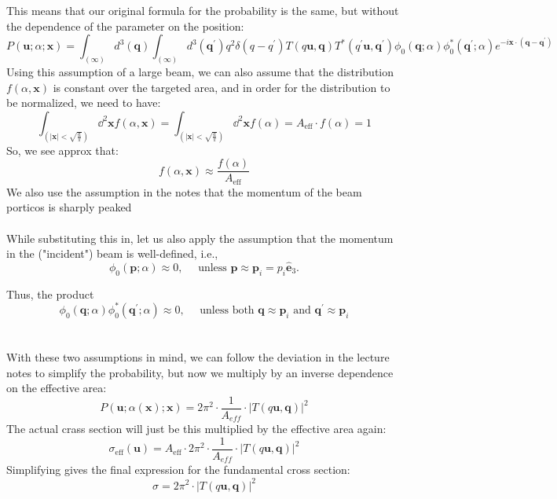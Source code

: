 \documentclass[12pt]{article}
\begin{document}
This means that our original formula for the probability is the same, but without the dependence of the parameter on the position:
\begin{equation}
P(\mathbf{u} ; \alpha ; \mathbf{x})= \int_{(\infty)} d^3(\mathbf{q}) \int_{(\infty)} d^3\left(\mathbf{q}^{\prime}\right) q^2 \delta\left(q-q^{\prime}\right) T(q \mathbf{u}, \mathbf{q}) T^*\left(q^{\prime} \mathbf{u}, \mathbf{q}^{\prime}\right) \phi_0(\mathbf{q} ; \alpha) \phi_0^*\left(\mathbf{q}^{\prime} ; \alpha\right) e^{-i \mathbf{x} \cdot\left(\mathbf{q}-\mathbf{q}^{\prime}\right)}
\end{equation}
Using this assumption of a large beam, we can also assume that the distribution $f(\alpha, \textbf{x})$ is constant over the targeted area, and in order for the distribution to be normalized, we need to have:
\begin{equation}
\int_{(|\textbf{x}| < \sqrt{\frac{a}{\pi}})} \dd^2{\textbf{x}} f(\alpha, \textbf{x}) = \int_{(|\textbf{x}| < \sqrt{\frac{a}{\pi}})} \dd^2{\textbf{x}} f(\alpha) = A_{\text{eff}} \cdot f(\alpha ) = 1
\end{equation}
So, we see approx that:
\begin{equation}
  f(\alpha ,\textbf{x}) \approx \frac{f(\alpha )}{A_{\text{eff}}}
\end{equation}
We also use the assumption in the notes that the momentum of the beam porticos is sharply peaked\\\\
While substituting this in, let us also apply the assumption that the momentum in the ("incident") beam is well-defined, i.e.,
$$
\phi_0(\mathbf{p} ; \alpha) \approx 0, \quad \text { unless } \mathbf{p} \approx \mathbf{p}_i=p_i \hat{\mathbf{e}}_3 .
$$

Thus, the product
$$
\phi_0(\mathbf{q} ; \alpha) \phi_0^*\left(\mathbf{q}^{\prime} ; \alpha\right) \approx 0, \quad \text { unless both } \mathbf{q} \approx \mathbf{p}_i \text { and } \mathbf{q}^{\prime} \approx \mathbf{p}_i
$$
\\\\
With these two assumptions in mind, we can follow the deviation in the lecture notes to simplify the probability, but now we multiply by an inverse dependence on the effective area:
\begin{equation}
  P(\mathbf{u} ; \alpha(\textbf{x}) ; \mathbf{x})= 2\pi ^{2}\cdot \frac{1}{A_{eff}}\cdot|T(q \mathbf{u}, \textbf{q})|^2 
\end{equation}
The actual crass section will just be this multiplied by the effective area again:
\begin{equation}
\sigma_{\text{eff}}(\textbf{u}) = A_{\text{eff}} \cdot2\pi ^{2}\cdot \frac{1}{A_{eff}}\cdot|T(q \mathbf{u}, \textbf{q})|^2
\end{equation}
Simplifying gives the final expression for the fundamental cross section:
\begin{equation}
\sigma = 2\pi ^{2}\cdot |T(q \mathbf{u}, \textbf{q})|^2
\end{equation}
\end{document}

